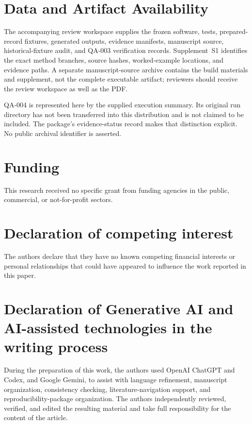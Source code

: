 \documentclass[a4paper,fleqn]{cas-dc}
\begin{document}

\section*{Data and Artifact Availability}

The accompanying review workspace supplies the frozen software, tests, prepared-record fixtures, generated outputs, evidence manifests, manuscript source, historical-fixture audit, and QA-003 verification records. Supplement~S1 identifies the exact method branches, source hashes, worked-example locations, and evidence paths. A separate manuscript-source archive contains the build materials and supplement, not the complete executable artifact; reviewers should receive the review workspace as well as the PDF.

QA-004 is represented here by the supplied execution summary. Its original run directory has not been transferred into this distribution and is not claimed to be included. The package's evidence-status record makes that distinction explicit. No public archival identifier is asserted.

\section*{Funding}

This research received no specific grant from funding agencies in the public, commercial, or not-for-profit sectors.

\section*{Declaration of competing interest}

The authors declare that they have no known competing financial interests or personal relationships that could have appeared to influence the work reported in this paper.

\section*{Declaration of Generative AI and AI-assisted technologies in the writing process}

During the preparation of this work, the authors used OpenAI ChatGPT and Codex, and Google Gemini, to assist with language refinement, manuscript organization, consistency checking, literature-navigation support, and reproducibility-package organization. The authors independently reviewed, verified, and edited the resulting material and take full responsibility for the content of the article.
\end{document}
